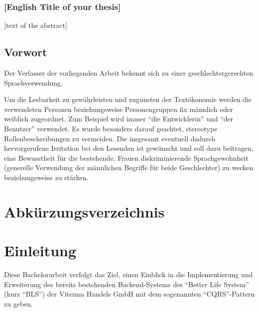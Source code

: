 \documentclass[a4paper,12pt,twoside]{scrreprt}
\begin{document}
\subsection*{[English Title of your thesis]}

[text of the abstract]

\newpage
\section*{Vorwort}
\label{sec:vorwort}

Der Verfasser der vorliegenden Arbeit bekennt sich zu einer geschlechtergerechten Sprachverwendung.

Um die Lesbarkeit zu gewährleisten und zugunsten der Textökonomie werden die verwendeten Personen beziehungsweise Personengruppen fix männlich oder weiblich zugeordnet. Zum Beispiel wird immer \enquote{die Entwicklerin} und \enquote{der Benutzer} verwendet. Es wurde besonders darauf geachtet, stereotype Rollenbeschreibungen zu vermeiden. Die insgesamt eventuell dadurch hervorgerufene Irritation bei den Lesenden ist gewünscht und soll dazu beitragen, eine Bewusstheit für die bestehende, Frauen diskriminierende Sprachgewohnheit (generelle Verwendung der männlichen Begriffe für beide Geschlechter) zu wecken beziehungsweise zu stärken.

\cleardoublepage %
\tableofcontents

\clearpage
{}
{}
\listoffigures

\clearpage
{}
{}
\chapter*{Abkürzungsverzeichnis}
\begin{acronym}
\end{acronym}

\chapter{Einleitung}
\label{chap:einleitung}
Diese Bachelorarbeit verfolgt das Ziel, einen Einblick in die Implementierung und Erweiterung des bereits bestehenden Backend-Systems des \enquote{Better Life System} (kurz \enquote{BLS}) der Viterma Handels GmbH mit dem sogenannten \enquote{CQRS}-Pattern zu geben.
\end{document}
